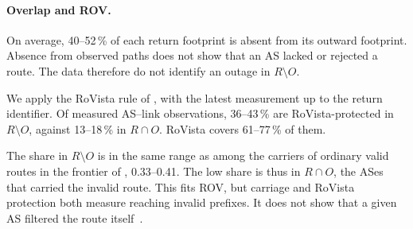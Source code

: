 \paragraph{Overlap and ROV\@.}
On average, 40--52\,\% of each return footprint is absent from its outward footprint.
Absence from observed paths does not show that an AS lacked or rejected a route.
The data therefore do not identify an outage in $R\setminus O$.

We apply the RoVista rule of , with the latest measurement up to the return identifier.
Of measured AS--link observations, 36--43\,\% are RoVista-protected in $R\setminus O$, against 13--18\,\% in $R\cap O$.
RoVista covers 61--77\,\% of them.

The share in $R\setminus O$ is in the same range as among the carriers of ordinary valid routes in the frontier of , 0.33--0.41.
The low share is thus in $R\cap O$, the ASes that carried the invalid route.
This fits ROV, but carriage and RoVista protection both measure reaching invalid prefixes.
It does not show that a given AS filtered the route itself~\cite{li2026rscope}.

